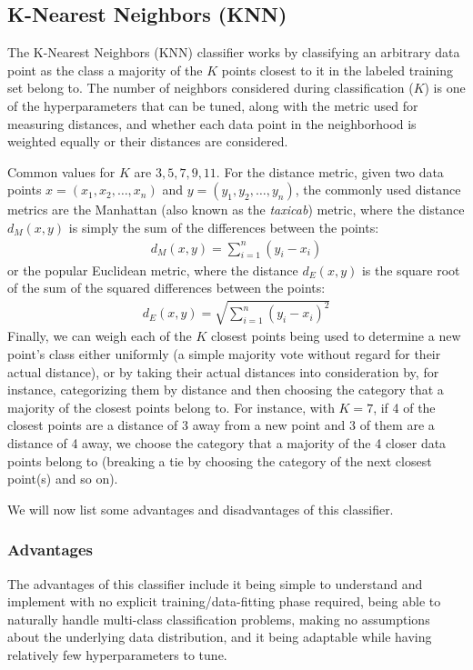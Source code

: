 \documentclass[journal,twocolumn,12pt,twoside]{IEEEtran}
\begin{document}
\subsection{K-Nearest Neighbors (KNN)}
The K-Nearest Neighbors (KNN) classifier works by classifying an arbitrary data point as the class a majority of the $K$ points closest to it in the labeled training set belong to. The number of neighbors considered during classification ($K$) is one of the hyperparameters that can be tuned, along with the metric used for measuring distances, and whether each data point in the neighborhood is weighted equally or their distances are considered.
\par Common values for $K$ are $3, 5, 7, 9, 11$. For the distance metric, given two data points $x=(x_1, x_2, \ldots, x_n)$ and $y=(y_1, y_2, \ldots, y_n)$, the commonly used distance metrics are the Manhattan (also known as the \textit{taxicab}) metric, where the distance $d_M(x,y)$ is simply the sum of the differences between the points:
\begin{align*}
    d_M(x,y)=\sum_{i=1}^n{\left(y_i-x_i\right)}
\end{align*}
or the popular Euclidean metric, where the distance $d_E(x,y)$ is the square root of the sum of the squared differences between the points:
\begin{align*}
    d_E(x,y)=\sqrt{\sum_{i=1}^n{(y_i-x_i)^2}}
\end{align*}
Finally, we can weigh each of the $K$ closest points being used to determine a new point's class either uniformly (a simple majority vote without regard for their actual distance), or by taking their actual distances into consideration by, for instance, categorizing them by distance and then choosing the category that a majority of the closest points belong to. For instance, with $K=7$, if 4 of the closest points are a distance of 3 away from a new point and 3 of them are a distance of 4 away, we choose the category that a majority of the 4 closer data points belong to (breaking a tie by choosing the category of the next closest point(s) and so on).
\par We will now list some advantages and disadvantages of this classifier.
\subsubsection{Advantages}
The advantages of this classifier include it being simple to understand and implement with no explicit training/data-fitting phase required, being able to naturally handle multi-class classification problems, making no assumptions about the underlying data distribution, and it being adaptable while having relatively few hyperparameters to tune.
\end{document}
